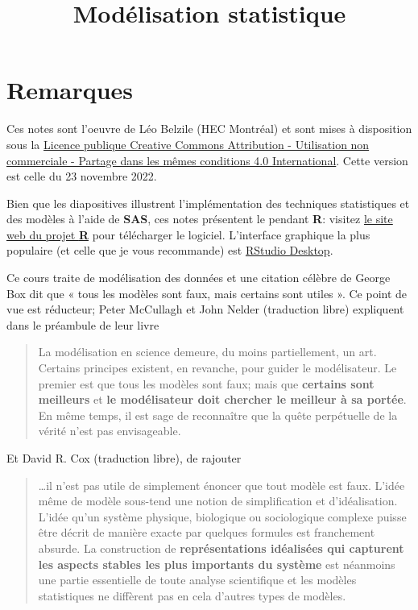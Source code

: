 \documentclass[
  11pt,
  letterpaper,
]{article}
\title{Modélisation statistique}
\author{}
\date{\vspace{-2.5em}}
\let\oldhref\href
\renewcommand{\href}[2]{#2\footnote{\url{#1}}}
\theoremstyle{definition}
\theoremstyle{definition}
\theoremstyle{definition}
\theoremstyle{definition}
\theoremstyle{remark}
\begin{document}
\maketitle

\let\href\oldhref

{
\setcounter{tocdepth}{2}
\tableofcontents
}
\hypertarget{remarques}{%
\section*{Remarques}\label{remarques}}

Ces notes sont l'oeuvre de Léo Belzile (HEC Montréal) et sont mises à disposition sous la \href{https://creativecommons.org/licenses/by-nc-sa/4.0/legalcode.fr}{Licence publique Creative Commons Attribution - Utilisation non commerciale - Partage dans les mêmes conditions 4.0 International}. Cette version est celle du 23 novembre 2022.

Bien que les diapositives illustrent l'implémentation des techniques statistiques et des modèles à l'aide de \textbf{SAS}, ces notes présentent le pendant \textbf{R}: visitez \href{https://cran.r-project.org/}{le site web du projet \textbf{R}} pour télécharger le logiciel. L'interface graphique la plus populaire (et celle que je vous recommande) est \href{https://www.rstudio.com/products/rstudio/download/}{RStudio Desktop}.

Ce cours traite de modélisation des données et une citation célèbre de George Box dit que « tous les modèles sont faux, mais certains sont utiles ». Ce point de vue est réducteur; Peter McCullagh et John Nelder (traduction libre) expliquent dans le préambule de leur livre

\begin{quote}
La modélisation en science demeure, du moins partiellement, un art. Certains principes existent, en revanche, pour guider le modélisateur. Le premier est que tous les modèles sont faux; mais que \textbf{certains sont meilleurs} et \textbf{le modélisateur doit chercher le meilleur à sa portée}. En même temps, il est sage de reconnaître que la quête perpétuelle de la vérité n'est pas envisageable.
\end{quote}

Et David R. Cox (traduction libre), de rajouter

\begin{quote}
\ldots il n'est pas utile de simplement énoncer que tout modèle est faux. L'idée même de modèle sous-tend une notion de simplification et d'idéalisation. L'idée qu'un système physique, biologique ou sociologique complexe puisse être décrit de manière exacte par quelques formules est franchement absurde. La construction de \textbf{représentations idéalisées qui capturent les aspects stables les plus importants du système} est néanmoins une partie essentielle de toute analyse scientifique et les modèles statistiques ne diffèrent pas en cela d'autres types de modèles.
\end{quote}
\end{document}
